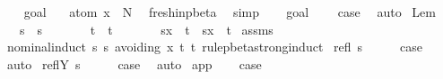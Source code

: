 \begin{isabellebody}
\ \ \isamarkupfalse%
\ goal{}\ \isamarkupfalse%
\ {}{\isacharcolon}\ {\isachardoublequoteopen}atom\ x\ {\isasymsharp}\ N{\isacharprime}{\isachardoublequoteclose}\ \isamarkupfalse%
\ fresh{\isacharunderscore}in{\isacharunderscore}pbeta\ \isamarkupfalse%
\ simp\isanewline
\ \ \isamarkupfalse%
\ goal{}\ {}\ {}\ \isamarkupfalse%
\ {\isacharquery}case\ \isamarkupfalse%
\ auto\isanewline
{}\isamarkupfalse%
%
\endisatagproof
{\isafoldproof}%
%
\isadelimproof
\isanewline
%
\endisadelimproof
\isanewline
{}\isamarkupfalse%
\ Lem{}{\isacharunderscore}{}{\isacharunderscore}{}{\isacharcolon}\isanewline
\ \ \ {\isachardoublequoteopen}s\ {\isasymggreater}\ s{\isacharprime}{\isachardoublequoteclose}\isanewline
\ \ \ \ \ \ \ {\isachardoublequoteopen}t\ {\isasymggreater}\ t{\isacharprime}{\isachardoublequoteclose}\isanewline
\ \ \ \ \ \ \ {\isachardoublequoteopen}{\isacharparenleft}s{\isacharbrackleft}x\ {\isacharcolon}{\isacharcolon}{\isacharequal}\ t{\isacharbrackright}{\isacharparenright}\ {\isasymggreater}\ {\isacharparenleft}s{\isacharprime}{\isacharbrackleft}x\ {\isacharcolon}{\isacharcolon}{\isacharequal}\ t{\isacharprime}{\isacharbrackright}{\isacharparenright}{\isachardoublequoteclose}\isanewline
%
\isadelimproof
%
\endisadelimproof
%
\isatagproof
{}\isamarkupfalse%
\ assms\ \isamarkupfalse%
\ {\isacharparenleft}nominal{\isacharunderscore}induct\ s\ s{\isacharprime}\ avoiding{\isacharcolon}\ x\ t\ t{\isacharprime}\ rule{\isacharcolon}pbeta{\isachardot}strong{\isacharunderscore}induct{\isacharparenright}\isanewline
{}\isamarkupfalse%
\ {\isacharparenleft}refl\ s{\isacharparenright}\isanewline
\ \ \isamarkupfalse%
\ \isamarkupfalse%
\ {\isacharquery}case\ \isamarkupfalse%
\ auto\isanewline
{}\isamarkupfalse%
\isanewline
{}\isamarkupfalse%
\ {\isacharparenleft}reflY\ s{\isacharparenright}\isanewline
\ \ \isamarkupfalse%
\ \isamarkupfalse%
\ {\isacharquery}case\ \isamarkupfalse%
\ auto\isanewline
{}\isamarkupfalse%
\isanewline
{}\isamarkupfalse%
\ app\isanewline
\ \ \isamarkupfalse%
\ {\isacharquery}case\ \isanewline
\ \ \isamarkupfalse%

\end{isabellebody}
